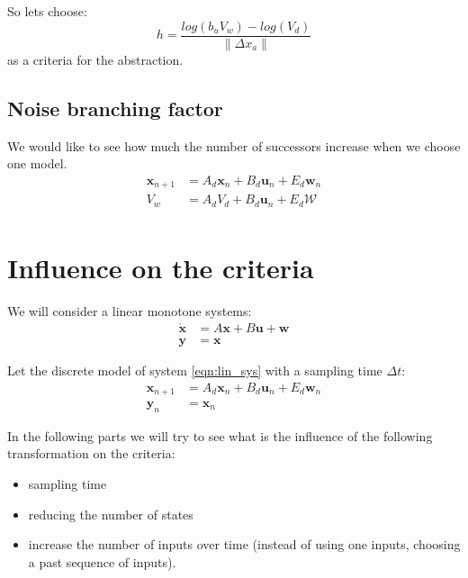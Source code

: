 \documentclass{article}
\theoremstyle{named}
\begin{document}
So lets choose:
\begin{equation}
h = 	\frac{log(b_u V_w) -log(V_d) }{\left \| \Delta x_a \right \|}
\end{equation}
as a criteria for the abstraction.

\subsection{Noise branching factor}

We would like to see how much the number of successors increase when we choose one model.
\begin{align*}
\mathbf{x}_{n+1} &= A_d \mathbf{x}_n + B_d \mathbf{u}_n + E_d \mathbf{w}_n\\
V_{w} &= A_d V_d + B_d \mathbf{u}_n + E_d \mathcal{W}\\
\end{align*}

\section{Influence on the criteria}
We will consider a linear monotone systems:
\begin{equation}\label{eqn:lin_sys}
\begin{split}
\dot{\mathbf{x}} &= A \mathbf{x} + B \mathbf{u} + \mathbf{w}\\
\mathbf{y} &= \mathbf{x}
\end{split}
\end{equation}

Let the discrete model of system \ref{eqn:lin_sys} with a sampling time $\Delta t$:
\begin{equation}\label{eqn:disc_lin_sys}
\begin{split}
\mathbf{x}_{n+1} &= A_d \mathbf{x}_n + B_d \mathbf{u}_n+ E_d \mathbf{w}_n\\
\mathbf{y}_n &= \mathbf{x}_n
\end{split}
\end{equation}


In the following parts we will try to see what is the influence of the following transformation on the criteria:
\begin{itemize}
\item sampling time
\item reducing the number of states
\item increase the number of inputs over time (instead of using one inputs, choosing a past sequence of inputs).
\end{itemize}
\end{document}
